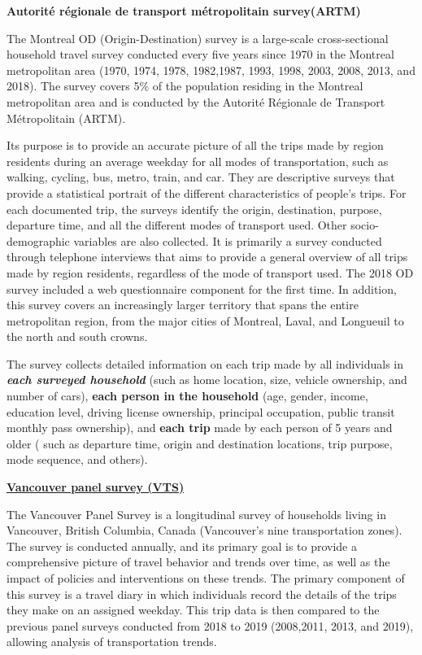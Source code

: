 \documentclass[
11pt, %
oneside, %
english, %
singlespacing, %
]{macthesis} %
\begin{document}
\textbf{Autorité régionale de transport métropolitain survey(ARTM)}

The Montreal OD (Origin-Destination) survey is a large-scale cross-sectional household travel survey conducted every five years since 1970 in the Montreal metropolitan area (1970, 1974, 1978, 1982,1987, 1993, 1998, 2003, 2008, 2013, and 2018). The survey covers 5\% of the population residing in the Montreal metropolitan area and is conducted by the Autorité Régionale de Transport Métropolitain (ARTM).

Its purpose is to provide an accurate picture of all the trips made by region residents during an average weekday for all modes of transportation, such as walking, cycling, bus, metro, train, and car. They are descriptive surveys that provide a statistical portrait of the different characteristics of people's trips. For each documented trip, the surveys identify the origin, destination, purpose, departure time, and all the different modes of transport used. Other socio-demographic variables are also collected. It is primarily a survey conducted through telephone interviews that aims to provide a general overview of all trips made by region residents, regardless of the mode of transport used. The 2018 OD survey included a web questionnaire component for the first time. In addition, this survey covers an increasingly larger territory that spans the entire metropolitan region, from the major cities of Montreal, Laval, and Longueuil to the north and south crowns.

The survey collects detailed information on each trip made by all individuals in \textbf{\emph{each surveyed household}} (such as home location, size, vehicle ownership, and number of cars), \textbf{each person in the household} (age, gender, income, education level, driving license ownership, principal occupation, public transit monthly pass ownership), and \textbf{each trip} made by each person of 5 years and older ( such as departure time, origin and destination locations, trip purpose, mode sequence, and others).

\textbf{\href{https://vancouver.ca/streets-transportation/annual-transportation-survey.aspx}{Vancouver panel survey (VTS)}}

The Vancouver Panel Survey is a longitudinal survey of households living in Vancouver, British Columbia, Canada (Vancouver's nine transportation zones). The survey is conducted annually, and its primary goal is to provide a comprehensive picture of travel behavior and trends over time, as well as the impact of policies and interventions on these trends. The primary component of this survey is a travel diary in which individuals record the details of the trips they make on an assigned weekday. This trip data is then compared to the previous panel surveys conducted from 2018 to 2019 (2008,2011, 2013, and 2019), allowing analysis of transportation trends.
\end{document}
